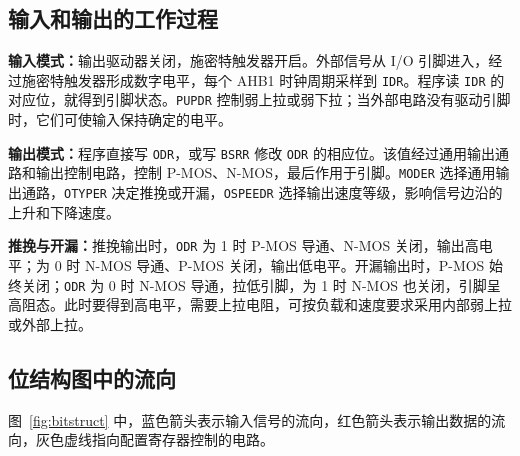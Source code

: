 \documentclass[UTF8,a4paper,zihao=5,fontset=none]{ctexart}
\newcommand{\code}[1]{\texttt{#1}}
\begin{document}
\subsection{输入和输出的工作过程}

\textbf{输入模式：}输出驱动器关闭，施密特触发器开启。外部信号从 I/O 引脚进入，经过施密特触发器形成数字电平，每个 AHB1 时钟周期采样到 \code{IDR}。程序读 \code{IDR} 的对应位，就得到引脚状态。\code{PUPDR} 控制弱上拉或弱下拉；当外部电路没有驱动引脚时，它们可使输入保持确定的电平。

\textbf{输出模式：}程序直接写 \code{ODR}，或写 \code{BSRR} 修改 \code{ODR} 的相应位。该值经过通用输出通路和输出控制电路，控制 P-MOS、N-MOS，最后作用于引脚。\code{MODER} 选择通用输出通路，\code{OTYPER} 决定推挽或开漏，\code{OSPEEDR} 选择输出速度等级，影响信号边沿的上升和下降速度。

\textbf{推挽与开漏：}推挽输出时，\code{ODR} 为 1 时 P-MOS 导通、N-MOS 关闭，输出高电平；为 0 时 N-MOS 导通、P-MOS 关闭，输出低电平。开漏输出时，P-MOS 始终关闭；\code{ODR} 为 0 时 N-MOS 导通，拉低引脚，为 1 时 N-MOS 也关闭，引脚呈高阻态。此时要得到高电平，需要上拉电阻，可按负载和速度要求采用内部弱上拉或外部上拉。

\newpage
\subsection{位结构图中的流向}

图~\ref{fig:bitstruct} 中，蓝色箭头表示输入信号的流向，红色箭头表示输出数据的流向，灰色虚线指向配置寄存器控制的电路。
\end{document}
